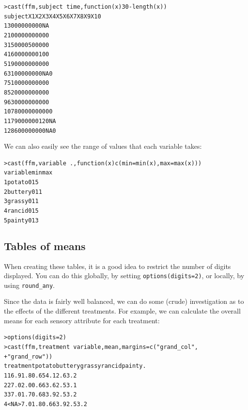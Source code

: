 \documentclass[oneside,letterpaper]{scrartcl}
\begin{document}
\begin{alltt}
> cast(ffm, subject ~ time, function(x) 30 - length(x))
   subject X1 X2 X3 X4 X5 X6 X7 X8 X9 X10
1        3  0  0  0  0  0  0  0  0  0  NA
2       10  0  0  0  0  0  0  0  0  0   0
3       15  0  0  0  0  5  0  0  0  0   0
4       16  0  0  0  0  0  0  0  1  0   0
5       19  0  0  0  0  0  0  0  0  0   0
6       31  0  0  0  0  0  0  0  0 NA   0
7       51  0  0  0  0  0  0  0  0  0   0
8       52  0  0  0  0  0  0  0  0  0   0
9       63  0  0  0  0  0  0  0  0  0   0
10      78  0  0  0  0  0  0  0  0  0   0
11      79  0  0  0  0  0  0  1  2  0  NA
12      86  0  0  0  0  0  0  0  0 NA   0

\end{alltt}

We can also easily see the range of values that each variable takes:

\begin{alltt}
> cast(ffm, variable ~ ., function(x) c(min = min(x), max = max(x)))
  variable min max
1   potato   0  15
2  buttery   0  11
3   grassy   0  11
4   rancid   0  15
5   painty   0  13

\end{alltt}

\subsection{Tables of means}\label{sub:tables_of_means}

When creating these tables, it is a good idea to restrict the number of digits displayed.  You can do this globally, by setting {\tt options(digits=2)}, or locally, by using {\tt round\_any}.

Since the data is fairly well balanced, we can do some (crude) investigation as to the effects of the different treatments.  For example, we can calculate the overall means for each sensory attribute for each treatment:

\begin{alltt}
> options(digits = 2)
> cast(ffm, treatment ~ variable, mean, margins = c("grand_col", 
+     "grand_row"))
  treatment potato buttery grassy rancid painty   .
1         1    6.9     1.8   0.65    4.1    2.6 3.2
2         2    7.0     2.0   0.66    3.6    2.5 3.1
3         3    7.0     1.7   0.68    3.9    2.5 3.2
4      <NA>    7.0     1.8   0.66    3.9    2.5 3.2

\end{alltt}
\end{document}
